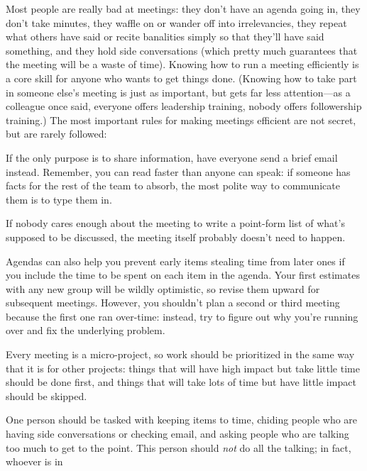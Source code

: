 Most people are really bad at meetings: they don't have an agenda going
in, they don't take minutes, they waffle on or wander off into
irrelevancies, they repeat what others have said or recite banalities
simply so that they'll have said something, and they hold side
conversations (which pretty much guarantees that the meeting will be a
waste of time). Knowing how to run a meeting efficiently is a core skill
for anyone who wants to get things done. (Knowing how to take part in
someone else's meeting is just as important, but gets far less
attention---as a colleague once said, everyone offers leadership
training, nobody offers followership training.) The most important rules
for making meetings efficient are not secret, but are rarely followed:

\begin{description}
\tightlist
\item[Decide if there actually needs to be a meeting.]
If the only purpose is to share information, have everyone send a
brief email instead. Remember, you can read faster than anyone can
speak: if someone has facts for the rest of the team to absorb, the
most polite way to communicate them is to type them in.
\item[Write an agenda.]
If nobody cares enough about the meeting to write a point-form list
of what's supposed to be discussed, the meeting itself probably
doesn't need to happen.
\item[Include timings in the agenda.]
Agendas can also help you prevent early items stealing time from
later ones if you include the time to be spent on each item in the
agenda. Your first estimates with any new group will be wildly
optimistic, so revise them upward for subsequent meetings. However,
you shouldn't plan a second or third meeting because the first one
ran over-time: instead, try to figure out why you're running over
and fix the underlying problem.
\item[Prioritize.]
Every meeting is a micro-project, so work should be prioritized in
the same way that it is for other projects: things that will have
high impact but take little time should be done first, and things
that will take lots of time but have little impact should be
skipped.
\item[Make one person responsible for keeping things moving.]
One person should be tasked with keeping items to time, chiding
people who are having side conversations or checking email, and
asking people who are talking too much to get to the point. This
person should \emph{not} do all the talking; in fact, whoever is in

\end{description}
